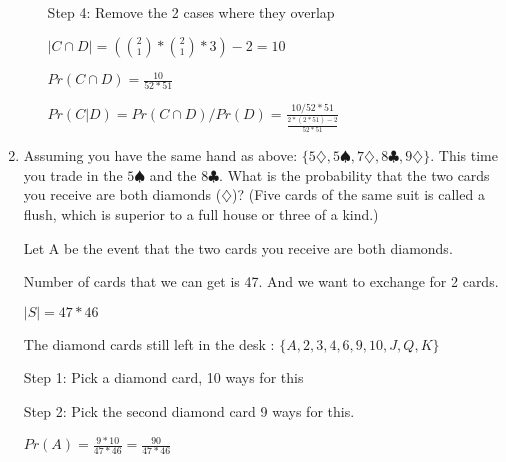 \documentclass[12pt]{article}
\newcounter{ques}
\newenvironment{question}{\stepcounter{ques}{\noindent\bf Question \arabic{ques}:}}{\vspace{5mm}}
\begin{document}
\begin{question}
\begin{enumerate}
\begin{enumerate}
			Step 4: Remove the 2 cases where they overlap

			$|C \cap D|= ({2 \choose 1} * {2 \choose 1} * 3) - 2 = 10$

			$Pr(C \cap D) = \frac{10}{52*51}$


			$Pr(C|D) = Pr(C \cap D)/Pr(D) = \frac{10/52*51}{\frac{2*(2 * 51) - 2}{52*51}}$

 		
 		\end{enumerate}
		
		\item Assuming you have the same hand as above: $\{5\diamondsuit, 5\spadesuit, 7\diamondsuit, 8\clubsuit, 9\diamondsuit \}$. This time you trade in the $5\spadesuit$ and the $8\clubsuit$. What is the probability that the two cards you receive are both diamonds ($\diamondsuit$)? (Five cards of the same suit is called a flush, which is superior to a full house or three of a kind.)
	
		Let A be the event that the two cards you receive are both diamonds.

		Number of cards that we can get is 47. And we want to exchange for 2 cards.

		$|S| = 47*46$ 

		The diamond cards still left in the desk : $\{A,2,3,4,6,9,10,J,Q,K\}$

		Step 1: Pick a diamond card, 10 ways for this

		Step 2: Pick the second diamond card 9 ways for this.

		$Pr(A) = \frac{9*10}{{47*46}} = \frac{90}{{47*46}}$

	\end{enumerate}
\end{question}
\newpage
\end{document}
